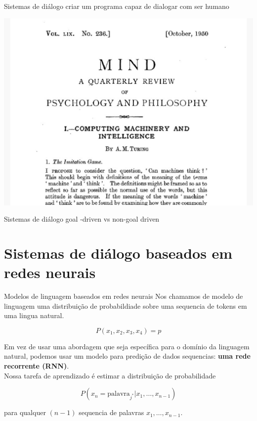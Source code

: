 \documentclass[10pt]{beamer}
\begin{document}
\maketitle


\begin{frame}{Sistemas de diálogo}
 criar um programa capaz de dialogar com ser humano
\begin{center}
\includegraphics[scale=0.16]{images/turing.jpg}
\end{center}
\end{frame}


\begin{frame}{Sistemas de diálogo}
goal -driven vs non-goal driven
\end{frame}

\section{Sistemas de diálogo baseados em redes neurais}

\begin{frame}{Modelos de linguagem baseados em redes neurais}
Nos chamamos de \alert{modelo de linguagem} uma distribuição de probabildiade sobre uma sequencia de tokens em uma lingua natural.

\[
P(x_1,x_2,x_3,x_4) = p
\]

Em vez de usar uma abordagem que seja específica para o domínio da linguagem natural, podemos usar um modelo para predição de dados sequencias:  \textbf{uma rede recorrente (RNN)}. \\

Nossa tarefa de aprendizado é estimar a distribuição de probabilidade

\[
P(x_{n} = \text{palavra}_{j^{*}} | x_{1}, \dots ,x_{n-1})
\]

para qualquer $(n-1)$ sequencia de palavras $x_{1}, \dots ,x_{n-1}$.

\end{frame}
\end{document}
